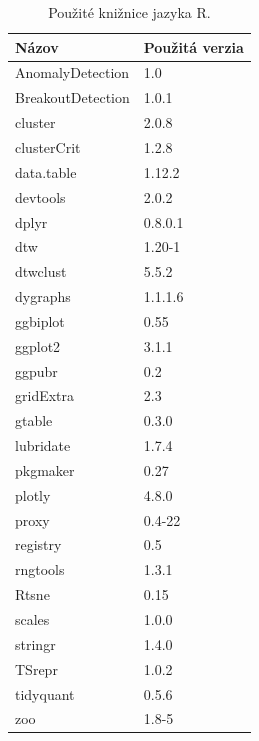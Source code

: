 \documentclass[a4paper,twoside,slovak,12pt,appendix]{article}
\begin{document}
\begin{appendices}
\begin{table}[ht]
  \centering
  \caption{Použité knižnice jazyka R.}
  \label{tab:libraries}
  \begin{tabular}{|l|l|}
    \hline
    \textbf{Názov}  &   \textbf{Použitá verzia}  \\ \hline
    AnomalyDetection    &   1.0         \\ \hline
    BreakoutDetection   &   1.0.1       \\ \hline
    cluster             &   2.0.8       \\ \hline
    clusterCrit         &   1.2.8       \\ \hline
    data.table          &   1.12.2      \\ \hline
    devtools            &   2.0.2       \\ \hline
    dplyr               &   0.8.0.1     \\ \hline
    dtw                 &   1.20-1      \\ \hline
    dtwclust            &   5.5.2       \\ \hline
    dygraphs            &   1.1.1.6     \\ \hline
    ggbiplot            &   0.55        \\ \hline
    ggplot2             &   3.1.1       \\ \hline
    ggpubr              &   0.2         \\ \hline
    gridExtra           &   2.3         \\ \hline
    gtable              &   0.3.0       \\ \hline
    lubridate           &   1.7.4       \\ \hline
    pkgmaker            &   0.27        \\ \hline
    plotly              &   4.8.0       \\ \hline
    proxy               &   0.4-22      \\ \hline
    registry            &   0.5         \\ \hline
    rngtools            &   1.3.1       \\ \hline
    Rtsne               &   0.15        \\ \hline
    scales              &   1.0.0       \\ \hline
    stringr             &   1.4.0       \\ \hline
    TSrepr              &   1.0.2       \\ \hline
    tidyquant           &   0.5.6       \\ \hline
    zoo                 &   1.8-5       \\ \hline
  \end{tabular}
\end{table}


\end{appendices}
\end{document}
